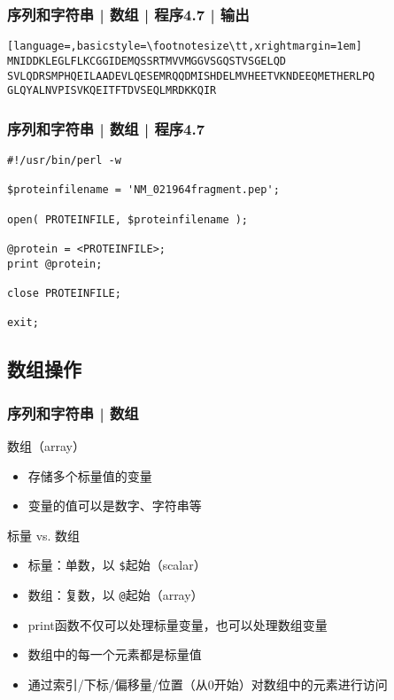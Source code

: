 \begin{frame}[fragile]
  \frametitle{序列和字符串 | 数组 | 程序4.7 | 输出}
\begin{lstlisting}[language=,basicstyle=\footnotesize\tt,xrightmargin=1em]
MNIDDKLEGLFLKCGGIDEMQSSRTMVVMGGVSGQSTVSGELQD
SVLQDRSMPHQEILAADEVLQESEMRQQDMISHDELMVHEETVKNDEEQMETHERLPQ
GLQYALNVPISVKQEITFTDVSEQLMRDKKQIR
\end{lstlisting}
\end{frame}

\begin{frame}[fragile]
  \frametitle{序列和字符串 | 数组 | \alert{程序4.7}}
\begin{lstlisting}
#!/usr/bin/perl -w

$proteinfilename = 'NM_021964fragment.pep';

open( PROTEINFILE, $proteinfilename );

@protein = <PROTEINFILE>;
print @protein;

close PROTEINFILE;

exit;
\end{lstlisting}
\end{frame}

\subsection{数组操作}
\begin{frame}[fragile]
  \frametitle{序列和字符串 | \alert{数组}}
  \begin{block}{数组（array）}
    \begin{itemize}
      \item 存储多个标量值的变量
      \item 变量的值可以是数字、字符串等
    \end{itemize}
  \end{block}
  \pause
  \begin{block}{标量 vs. 数组}
    \begin{itemize}
      \item 标量：单数，以 \verb|$|起始（scalar）
      \item 数组：复数，以 \verb|@|起始（array）
      \item print函数不仅可以处理标量变量，也可以处理数组变量
      \item 数组中的每一个元素都是标量值
      \item 通过索引/下标/偏移量/位置（从0开始）对数组中的元素进行访问
    \end{itemize}
  \end{block}
\end{frame}

